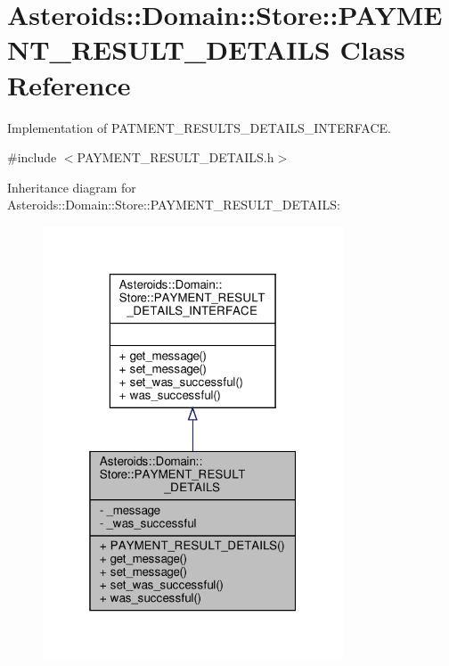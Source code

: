 \hypertarget{classAsteroids_1_1Domain_1_1Store_1_1PAYMENT__RESULT__DETAILS}{}\section{Asteroids\+:\+:Domain\+:\+:Store\+:\+:P\+A\+Y\+M\+E\+N\+T\+\_\+\+R\+E\+S\+U\+L\+T\+\_\+\+D\+E\+T\+A\+I\+LS Class Reference}
\label{classAsteroids_1_1Domain_1_1Store_1_1PAYMENT__RESULT__DETAILS}


Implementation of P\+A\+T\+M\+E\+N\+T\+\_\+\+R\+E\+S\+U\+L\+T\+S\+\_\+\+D\+E\+T\+A\+I\+L\+S\+\_\+\+I\+N\+T\+E\+R\+F\+A\+CE.  




{\ttfamily \#include $<$P\+A\+Y\+M\+E\+N\+T\+\_\+\+R\+E\+S\+U\+L\+T\+\_\+\+D\+E\+T\+A\+I\+L\+S.\+h$>$}



Inheritance diagram for Asteroids\+:\+:Domain\+:\+:Store\+:\+:P\+A\+Y\+M\+E\+N\+T\+\_\+\+R\+E\+S\+U\+L\+T\+\_\+\+D\+E\+T\+A\+I\+LS\+:\nopagebreak
\begin{figure}[H]
\begin{center}
\leavevmode
\includegraphics[width=253pt]{classAsteroids_1_1Domain_1_1Store_1_1PAYMENT__RESULT__DETAILS__inherit__graph}
\end{center}
\end{figure}


